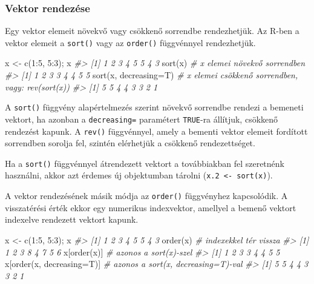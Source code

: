 \documentclass[
]{book}
\newenvironment{Shaded}{\begin{snugshade}}{\end{snugshade}}
\newcommand{\AttributeTok}[1]{\textcolor[rgb]{0.77,0.63,0.00}{#1}}
\newcommand{\CommentTok}[1]{\textcolor[rgb]{0.56,0.35,0.01}{\textit{#1}}}
\newcommand{\DecValTok}[1]{\textcolor[rgb]{0.00,0.00,0.81}{#1}}
\newcommand{\FunctionTok}[1]{\textcolor[rgb]{0.00,0.00,0.00}{#1}}
\newcommand{\NormalTok}[1]{#1}
\newcommand{\OtherTok}[1]{\textcolor[rgb]{0.56,0.35,0.01}{#1}}
\newcommand{\SpecialCharTok}[1]{\textcolor[rgb]{0.00,0.00,0.00}{#1}}
\begin{document}
\hypertarget{vektor-rendezuxe9se}{%
\subsubsection{Vektor rendezése}\label{vektor-rendezuxe9se}}

Egy vektor elemeit növekvő vagy csökkenő sorrendbe rendezhetjük. Az R-ben a vektor elemeit a \texttt{sort()} vagy az \texttt{order()} függvénnyel rendezhetjük.

\begin{Shaded}
\begin{Highlighting}[]
\NormalTok{x }\OtherTok{\textless{}{-}} \FunctionTok{c}\NormalTok{(}\DecValTok{1}\SpecialCharTok{:}\DecValTok{5}\NormalTok{, }\DecValTok{5}\SpecialCharTok{:}\DecValTok{3}\NormalTok{); x}
\CommentTok{\#\textgreater{} [1] 1 2 3 4 5 5 4 3}
\FunctionTok{sort}\NormalTok{(x)               }\CommentTok{\# x elemei növekvő sorrendben}
\CommentTok{\#\textgreater{} [1] 1 2 3 3 4 4 5 5}
\FunctionTok{sort}\NormalTok{(x, }\AttributeTok{decreasing=}\NormalTok{T) }\CommentTok{\# x elemei csökkenő sorrendben, vagy: rev(sort(x))}
\CommentTok{\#\textgreater{} [1] 5 5 4 4 3 3 2 1}
\end{Highlighting}
\end{Shaded}

A \texttt{sort()} függvény alapértelmezés szerint növekvő sorrendbe rendezi a bemeneti vektort, ha azonban a \texttt{decreasing=} paramétert \texttt{TRUE}-ra állítjuk, csökkenő rendezést kapunk. A \texttt{rev()} függvénnyel, amely a bementi vektor elemeit fordított sorrendben sorolja fel, szintén elérhetjük a csökkenő rendezettséget.

Ha a \texttt{sort()} függvénnyel átrendezett vektort a továbbiakban fel szeretnénk használni, akkor azt érdemes új objektumban tárolni (\texttt{x.2\ \textless{}-\ sort(x)}).

A vektor rendezésének másik módja az \texttt{order()} függvényhez kapcsolódik. A visszatérési érték ekkor egy numerikus indexvektor, amellyel a bemenő vektort indexelve rendezett vektort kapunk.

\begin{Shaded}
\begin{Highlighting}[]
\NormalTok{x }\OtherTok{\textless{}{-}} \FunctionTok{c}\NormalTok{(}\DecValTok{1}\SpecialCharTok{:}\DecValTok{5}\NormalTok{, }\DecValTok{5}\SpecialCharTok{:}\DecValTok{3}\NormalTok{); x}
\CommentTok{\#\textgreater{} [1] 1 2 3 4 5 5 4 3}
\FunctionTok{order}\NormalTok{(x)                    }\CommentTok{\# indexekkel tér vissza}
\CommentTok{\#\textgreater{} [1] 1 2 3 8 4 7 5 6}
\NormalTok{x[}\FunctionTok{order}\NormalTok{(x)]                 }\CommentTok{\# azonos a sort(x){-}szel}
\CommentTok{\#\textgreater{} [1] 1 2 3 3 4 4 5 5}
\NormalTok{x[}\FunctionTok{order}\NormalTok{(x, }\AttributeTok{decreasing=}\NormalTok{T)]   }\CommentTok{\# azonos a sort(x, decreasing=T){-}val}
\CommentTok{\#\textgreater{} [1] 5 5 4 4 3 3 2 1}
\end{Highlighting}
\end{Shaded}
\end{document}

